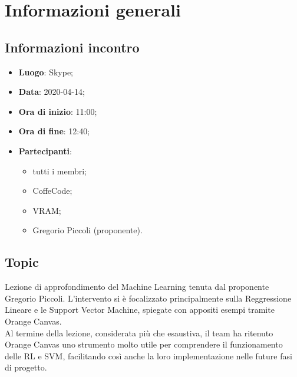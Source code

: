 \section{Informazioni generali}
\subsection{Informazioni incontro}
\begin{itemize}
\item \textbf{Luogo}: Skype;
\item \textbf{Data}: 2020-04-14;
\item \textbf{Ora di inizio}: 11:00;
\item \textbf{Ora di fine}: 12:40;
\item \textbf{Partecipanti}:
	\begin{itemize}
		\item tutti i membri;
		\item CoffeCode;
		\item VRAM;
		\item Gregorio Piccoli (proponente).
	\end{itemize}
\end{itemize}

\subsection{Topic}
Lezione di approfondimento del Machine Learning tenuta dal proponente Gregorio Piccoli. L'intervento si è focalizzato principalmente sulla Reggressione Lineare e le Support Vector Machine, spiegate con appositi esempi tramite Orange Canvas.\\
Al termine della lezione, considerata più che esaustiva, il team ha ritenuto Orange Canvas uno strumento molto utile per comprendere il funzionamento delle RL e SVM, facilitando così anche la loro implementazione nelle future fasi di progetto.